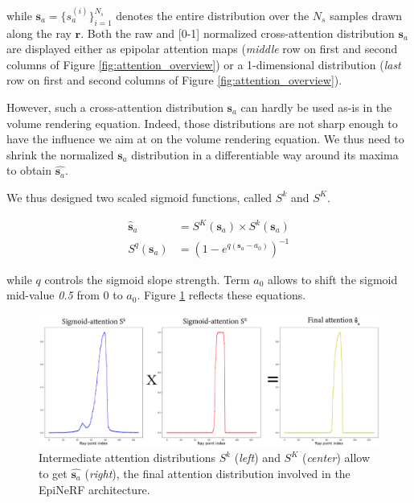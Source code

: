 while $\mathbf{s}_{a}=\{s_{a}^{(i)}\}_{i=1}^{N_{s}}$ denotes the entire distribution over the $N_s$ samples drawn along the ray $\mathbf{r}$. Both the raw and [0-1] normalized cross-attention distribution $\mathbf{s}_{a}$ are displayed either as epipolar attention maps (\textit{middle} row on first and second columns of Figure \ref{fig:attention_overview}) or a 1-dimensional distribution (\textit{last} row on first and second columns of Figure \ref{fig:attention_overview}). \newline

However, such a cross-attention distribution $\mathbf{s}_{a}$ can hardly be used as-is in the volume rendering equation. Indeed,  those distributions are not sharp enough to have the influence we aim at on the volume rendering equation. We thus need to shrink the normalized $\mathbf{s}_{a}$  distribution in a differentiable way around its maxima to obtain $\hat{\mathbf{s}_{a}}$. 

We thus designed two scaled sigmoid functions, called $S^{k}$ and $S^{K}$. 

\begin{align}
\hat{\textbf{s}}_{a} &= S^{K}(\textbf{s}_{a})\times S^{k}(\textbf{s}_{a}) \\
S^{q}(\mathbf{s}_{a}) &= \left(1- e^{q(\mathbf{s}_{a}-a_{0})}\right)^{-1}
\end{align}

while $q$ controls the sigmoid slope strength. Term $a_{0}$ allows to shift the sigmoid mid-value \textit{0.5} from 0 to $a_{0}$. Figure \ref{fig:attention_sigmoid} reflects these equations.

\begin{figure}[h!]
    \begin{center}
  \includegraphics[width=\linewidth]{images/epinerf/SUPP_ATT_OVERLEAF.png}
  \caption{Intermediate attention distributions $S^{k}$ (\textit{left}) and $S^{K}$ (\textit{center}) allow to get $\hat{\mathbf{s}_{a}}$ (\textit{right}), the final attention distribution involved in the EpiNeRF architecture.}
  \label{fig:attention_sigmoid}
  \end{center}
\end{figure}

